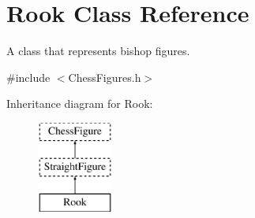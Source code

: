 \hypertarget{classRook}{}\section{Rook Class Reference}
\label{classRook}


A class that represents bishop figures.  




{\ttfamily \#include $<$Chess\+Figures.\+h$>$}

Inheritance diagram for Rook\+:\begin{figure}[H]
\begin{center}
\leavevmode
\includegraphics[height=3.000000cm]{classRook}
\end{center}
\end{figure}

